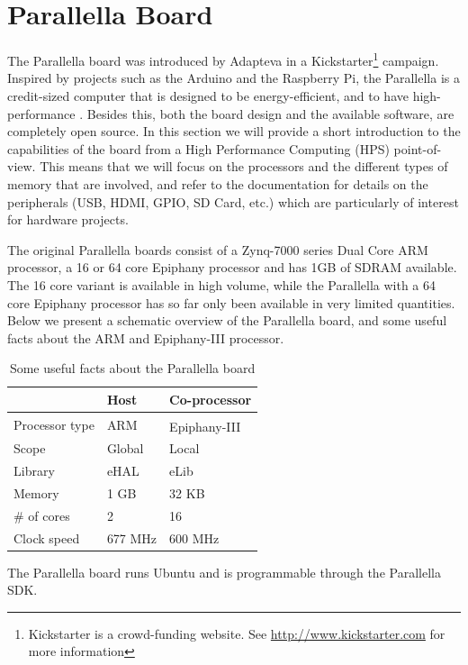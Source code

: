 \documentclass[fleqn]{article}
\renewcommand{\(}{\left(}
\renewcommand{\)}{\right)}
\newcommand{\tm}{\textsuperscript{\texttrademark}}
\begin{document}
\section{Parallella Board}

The Parallella board was introduced by Adapteva in a Kickstarter\footnote{Kickstarter is a crowd-funding website. See \url{http://www.kickstarter.com} for more information} campaign. Inspired by projects such as the Arduino and the Raspberry Pi, the Parallella is a credit-sized computer that is designed to be energy-efficient, and to have high-performance \cite{par:manual}. Besides this, both the board design and the available software, are completely open source. In this section we will provide a short introduction to the capabilities of the board from a High Performance Computing (HPS) point-of-view. This means that we will focus on the processors and the different types of memory that are involved, and refer to the documentation for details on the peripherals (USB, HDMI, GPIO, SD Card, etc.) which are particularly of interest for hardware projects. 

The original Parallella boards consist of a Zynq-7000 series Dual Core ARM processor, a 16 or 64 core Epiphany processor and has 1GB of SDRAM available. The 16 core variant is available in high volume, while the Parallella with a 64 core Epiphany processor has so far only been available in very limited quantities. Below we present a schematic overview of the Parallella board, and some useful facts about the ARM and Epiphany-III processor.

\begin{table}[h]
\centering
\begin{tabular}{l|ll}
& Host & Co-processor \\
\hline
Processor type & ARM & Epiphany-III\tm \\
Scope & Global & Local \\
Library & eHAL & eLib \\
Memory & 1 GB & 32 KB \\
\# of cores & 2 & 16 \\
Clock speed & 677 MHz & 600 MHz\\

\end{tabular}
\caption{Some useful facts about the Parallella board}
\end{table}




The Parallella board runs Ubuntu and is programmable through the Parallella SDK.
\end{document}
